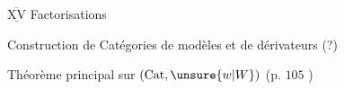$\underline{\overline{\mathrm{XV}}}$ Factorisations

Construction de Catégories de modèles et de dérivateurs (?)

Théorème principal sur $(\mathrm{Cat},\unsure{w|W})$ (p. $105$ )
